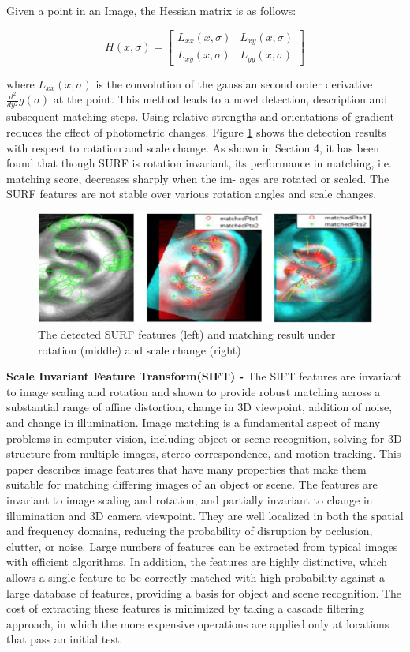 Given a point in an Image, the Hessian matrix is as follows:

\[
H(x,\sigma) =  
	\begin{bmatrix}
		L_{xx}(x,\sigma) &  L_{xy}(x,\sigma)\\
		L_{xy}(x,\sigma) &  L_{yy}(x,\sigma)
	\end{bmatrix}
\]

where $L_{xx}(x,\sigma)$ is the convolution of the gaussian second order derivative 
$\frac{d^2}{dy^2}g(\sigma)$ at the point. This method leads to a novel detection, description and subsequent matching steps. Using relative strengths and orientations of gradient reduces the effect of photometric changes. Figure \ref{fig:Figure9} shows the detection results with respect to rotation and scale change. As shown in Section 4, it has been found that though SURF is rotation invariant, its performance in matching, i.e. matching score, decreases sharply when the im- ages are rotated or scaled. The SURF features are not stable over various rotation angles and scale changes.
\\ 
\begin{figure}
	\includegraphics[width=\textwidth]{Figures/Figure9}
	\caption{The detected SURF features (left) and matching result under rotation (middle) and scale change (right)}
	\label{fig:Figure9}
\end{figure}

\textbf{Scale Invariant Feature Transform(SIFT) - } The SIFT features are invariant to image scaling and rotation and shown to provide robust matching across a substantial range of affine distortion, change in 3D viewpoint, addition of noise, and change in illumination. Image matching is a fundamental aspect of many problems in computer vision, including object or scene recognition, solving for 3D structure from multiple images, stereo correspondence, and motion tracking. This paper describes image features that have many properties that make them suitable for matching differing images of an object or scene. The features are invariant to image scaling and rotation, and partially invariant to change in illumination and 3D camera viewpoint. They are well localized in both the spatial and frequency domains, reducing the probability of disruption by occlusion, clutter, or noise. Large numbers of features can be extracted from typical images with efficient algorithms. In addition, the features are highly distinctive, which allows a single feature to be correctly matched with high probability against a large database of features, providing a basis for object and scene recognition.
The cost of extracting these features is minimized by taking a cascade filtering approach, in which the more expensive operations are applied only at locations that pass an initial test. 


